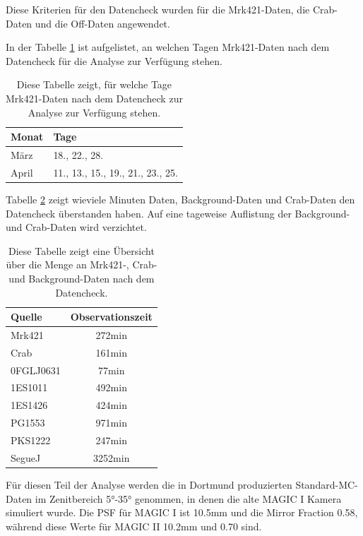 Diese Kriterien für den Datencheck wurden für die Mrk421-Daten, die Crab-Daten und die Off-Daten angewendet.

In der Tabelle \ref{tab:Datenset2-Mrk421} ist aufgelistet, an welchen Tagen Mrk421-Daten nach dem Datencheck für die Analyse zur Verfügung stehen.


\begin{table}[!h]
\centering
\caption{Diese Tabelle zeigt, für welche Tage Mrk421-Daten nach dem Datencheck zur Analyse zur Verfügung stehen.}
\label{tab:Datenset2-Mrk421}
\begin{tabular}{ll}
  \toprule
  Monat & Tage\\
  \midrule
  \midrule
März & 18., 22., 28.\\
April & 11., 13., 15., 19., 21., 23., 25. \\
  \bottomrule
\end{tabular}
\end{table}

Tabelle \ref{tab:Datenset2} zeigt wieviele Minuten Daten, Background-Daten und Crab-Daten den Datencheck überstanden haben. 
Auf eine tageweise Auflistung der Background- und Crab-Daten wird verzichtet.

\begin{table}[!h]
\centering
\caption{Diese Tabelle zeigt eine Übersicht über die Menge an Mrk421-, Crab- und Background-Daten nach dem Datencheck.}
\label{tab:Datenset2}
\begin{tabular}{lc}
  \toprule
  Quelle & Observationszeit\\
  \midrule
  \midrule
  Mrk421 & 272min\\
  \midrule
  Crab & 161min\\
  \midrule
  0FGLJ0631 & 77min \\
  1ES1011 & 492min \\
  1ES1426 & 424min \\
  PG1553 & 971min \\
  PKS1222 & 247min \\
  SegueJ & 3252min \\
  \bottomrule
\end{tabular}
\end{table}

Für diesen Teil der Analyse werden die in Dortmund produzierten Standard-MC-Daten im Zenitbereich 5°-35° genommen, in denen die alte MAGIC I Kamera simuliert wurde.
Die PSF für MAGIC I ist 10.5mm und die Mirror Fraction 0.58, während diese Werte für MAGIC II 10.2mm und 0.70 sind.

